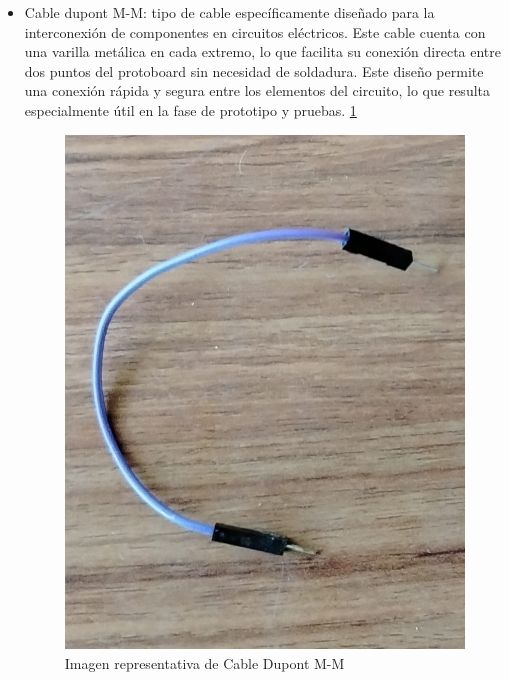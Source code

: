    \begin{itemize}
        \item Cable dupont M-M:  tipo de cable específicamente diseñado para la interconexión de componentes en circuitos eléctricos. Este cable cuenta con una varilla metálica en cada extremo, lo que facilita su conexión directa entre dos puntos del protoboard sin necesidad de soldadura. Este diseño permite una conexión rápida y segura entre los elementos del circuito, lo que resulta especialmente útil en la fase de prototipo y pruebas. \ref{fig:CableDupontMM}
    
          \begin{figure}[H]
            \centering
            \includegraphics[trim = {0mm 0mm 0mm 0mm},clip,scale=0.1]{12/Img/cableDupontMM.jpg}
            \caption{Imagen representativa de Cable Dupont M-M}
            \label{fig:CableDupontMM}
        \end{figure}
    \end{itemize}
    
